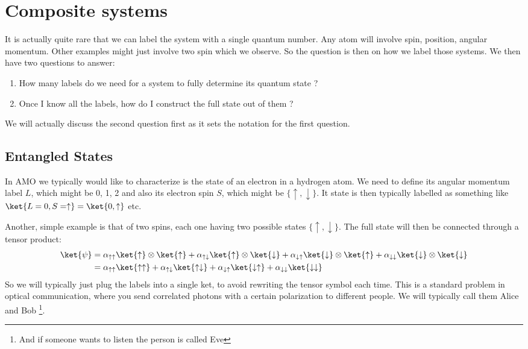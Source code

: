 \section{Composite systems}
It is actually quite rare that we can label the system with a single quantum number. Any atom will involve spin, position, angular momentum. Other examples might just involve two spin which we observe. So the question is then on how we label those systems. We then have two questions to answer:
\begin{enumerate}
\item How many labels do we need for a system to fully determine its quantum state ?
\item Once I know all the labels, how do I construct the full state out of them ?
\end{enumerate}
We will actually discuss the second question first as it sets the notation for the first question.



\subsection{Entangled States}
 
In AMO we typically would like to characterize is the state of an electron in a hydrogen atom. We need to define its angular momentum label $L$, which might be 0, 1, 2 and also its electron spin $S$, which might be $\{\uparrow, \downarrow\}$. It state is then typically labelled as something like $\ket{L=0, S=\uparrow} = \ket{0,\uparrow}$ etc.

Another, simple example is that of two spins, each one having two possible states $\{\uparrow, \downarrow\}$. The full state will then be connected through a tensor product:
\begin{align}
\ket{\psi} &= \alpha_{\uparrow\uparrow}\ket{\uparrow}\otimes\ket{\uparrow}+\alpha_{\uparrow\downarrow}\ket{\uparrow}\otimes\ket{\downarrow}+\alpha_{\downarrow\uparrow}\ket{\downarrow}\otimes\ket{\uparrow}+\alpha_{\downarrow\downarrow}\ket{\downarrow}\otimes\ket{\downarrow}\\
&= \alpha_{\uparrow\uparrow}\ket{\uparrow\uparrow}+\alpha_{\uparrow\downarrow}\ket{\uparrow\downarrow}+\alpha_{\downarrow\uparrow}\ket{\downarrow \uparrow}+\alpha_{\downarrow\downarrow}\ket{\downarrow\downarrow}
\end{align}
So we will typically just plug the labels into a single ket, to avoid rewriting the tensor symbol each time. This is a standard problem in optical communication, where you send correlated photons with a certain polarization to different people. We will typically call them Alice and Bob \footnote{And if someone wants to listen the person is called Eve}.

